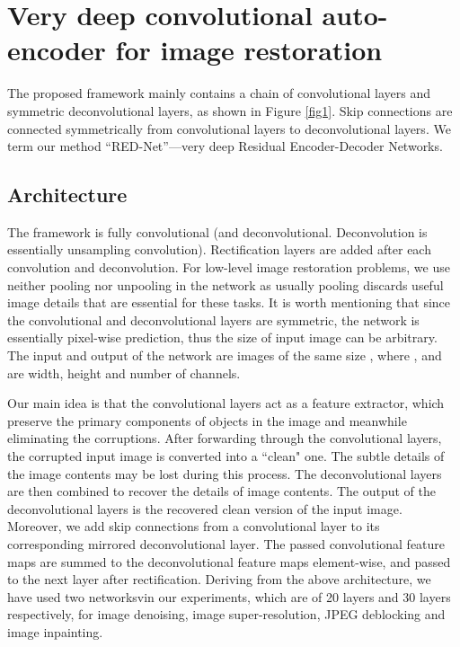 \documentclass[10pt,journal,compsoc]{IEEEtran}
\begin{document}
\section{Very deep convolutional auto-encoder for image restoration}
\label{sec:main}

The proposed framework mainly contains a chain of convolutional layers and symmetric
deconvolutional layers, as shown in Figure \ref{fig1}. Skip connections are connected
symmetrically from convolutional layers to deconvolutional layers. We term our method
``RED-Net''---very deep Residual Encoder-Decoder Networks.


\subsection{Architecture}

The framework is fully convolutional (and deconvolutional.  Deconvolution is essentially unsampling convolution). Rectification layers are added
after each convolution and deconvolution. For low-level image restoration problems, we
use neither pooling nor unpooling in the network as usually pooling discards useful image
details that are essential for these tasks. It is worth mentioning that since the convolutional
and deconvolutional layers are symmetric, the network is essentially pixel-wise prediction,
thus the size of input image can be arbitrary. The input and output of the network are images
of the same size , where ,  and  are width, height and number of channels.

Our main idea is that the convolutional layers act as a feature extractor, which preserve the
primary components of objects in the image and meanwhile eliminating the corruptions.
After forwarding through the convolutional layers, the corrupted input  image is converted into
a ``clean" one. The subtle details of the image contents may be lost during this process.
The deconvolutional layers are then combined to recover the details of image contents.
The output of the deconvolutional layers is the recovered clean version of the input image.
Moreover, we add skip connections  from a convolutional layer to its corresponding
mirrored deconvolutional layer. The passed convolutional feature maps are summed to the
deconvolutional feature maps element-wise, and passed to the next layer after rectification.
Deriving from the above architecture, we have used two networksvin our experiments, which are of 20 layers
 and 30 layers
respectively, for image denoising, image super-resolution, JPEG deblocking and image inpainting.
\end{document}
